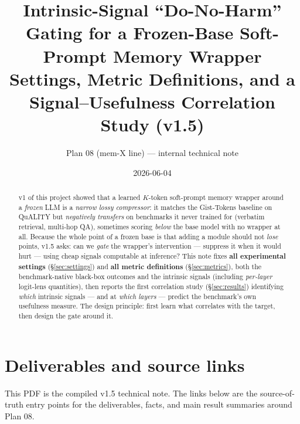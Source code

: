 \documentclass[11pt]{article}
\title{\textbf{Intrinsic-Signal ``Do-No-Harm'' Gating for a Frozen-Base
Soft-Prompt Memory Wrapper}\\[2pt]
\large Settings, Metric Definitions, and a Signal--Usefulness
Correlation Study (v1.5)}
\author{Plan 08 (mem-X line) --- internal technical note}
\date{2026-06-04}
\begin{document}
\maketitle

\begin{abstract}
v1 of this project showed that a learned $K$-token soft-prompt memory
wrapper around a \emph{frozen} LLM is a \emph{narrow lossy compressor}:
it matches the Gist-Tokens baseline on QuALITY but \emph{negatively
transfers} on benchmarks it never trained for (verbatim retrieval,
multi-hop QA), sometimes scoring \emph{below} the base model with no
wrapper at all. Because the whole point of a frozen base is that adding
a module should not \emph{lose} points, v1.5 asks: can we \emph{gate}
the wrapper's intervention --- suppress it when it would hurt --- using
cheap signals computable at inference? This note fixes \textbf{all
experimental settings} (\S\ref{sec:settings}) and \textbf{all metric
definitions} (\S\ref{sec:metrics}), both the benchmark-native black-box
outcomes and the intrinsic signals (including \emph{per-layer} logit-lens
quantities), then reports the first correlation study
(\S\ref{sec:results}) identifying \emph{which} intrinsic signals --- and
at \emph{which layers} --- predict the benchmark's own usefulness
measure. The design principle: first learn what correlates with the
target, then design the gate around it.
\end{abstract}

\tableofcontents

\section{Deliverables and source links}
\label{sec:deliverables}

This PDF is the compiled v1.5 technical note. The links below are the
source-of-truth entry points for the deliverables, facts, and main result
summaries around Plan 08.
\end{document}
